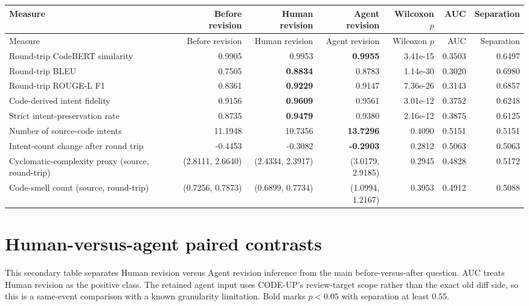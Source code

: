 \documentclass[11pt]{article}
\begin{document}
\begin{landscape}
\small
\setlength{\tabcolsep}{4pt}
\begin{longtable}{p{5.0cm}rrrrrr}
\toprule
Measure & Before revision & Human revision & Agent revision & Wilcoxon $p$ & AUC & Separation \\
\midrule
\endfirsthead
\toprule
Measure & Before revision & Human revision & Agent revision & Wilcoxon $p$ & AUC & Separation \\
\midrule
\endhead
Round-trip CodeBERT similarity & 0.9905 & 0.9953 & \textbf{0.9955} & 3.41e-15 & 0.3503 & 0.6497 \\
Round-trip BLEU & 0.7505 & \textbf{0.8834} & 0.8783 & 1.14e-30 & 0.3020 & 0.6980 \\
Round-trip ROUGE-L F1 & 0.8361 & \textbf{0.9229} & 0.9147 & 7.36e-26 & 0.3143 & 0.6857 \\
Code-derived intent fidelity & 0.9156 & \textbf{0.9609} & 0.9561 & 3.01e-12 & 0.3752 & 0.6248 \\
Strict intent-preservation rate & 0.8735 & \textbf{0.9479} & 0.9380 & 2.16e-12 & 0.3875 & 0.6125 \\
Number of source-code intents & 11.1948 & 10.7356 & \textbf{13.7296} & 0.4090 & 0.5151 & 0.5151 \\
Intent-count change after round trip & -0.4453 & -0.3082 & \textbf{-0.2903} & 0.2812 & 0.5063 & 0.5063 \\
Cyclomatic-complexity proxy (source, round-trip) & (2.8111, 2.6640) & (2.4334, 2.3917) & (3.0179, 2.9185) & 0.2945 & 0.4828 & 0.5172 \\
Code-smell count (source, round-trip) & (0.7256, 0.7873) & (0.6899, 0.7734) & (1.0994, 1.2167) & 0.3953 & 0.4912 & 0.5088 \\
\bottomrule
\end{longtable}
\end{landscape}

\section*{Human-versus-agent paired contrasts}
This secondary table separates Human revision versus Agent revision inference from the main before-versus-after question. AUC treats Human revision as the positive class. The retained agent input uses CODE-UP's review-target scope rather than the exact old diff side, so this is a same-event comparison with a known granularity limitation. Bold marks $p<0.05$ with separation at least $0.55$.
\end{document}
